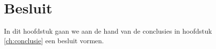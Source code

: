 \chapter{Besluit}
In dit hoofdstuk gaan we aan de hand van de conclusies in hoofdstuk \ref{ch:conclusie} een besluit vormen.